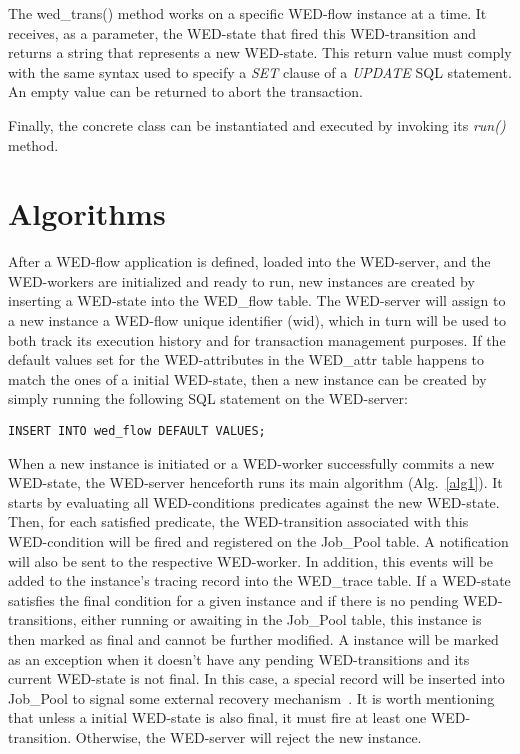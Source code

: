 \documentclass[12pt]{article}
\begin{document}
The wed\_trans() method works on a specific WED-flow instance at a time. It receives, as a parameter, the WED-state that  fired this WED-transition and returns a string that represents a new WED-state. This return value must comply with the same syntax used to specify a \emph{SET} clause of a \emph{UPDATE} SQL statement. An empty value can be returned to abort the transaction.

\par Finally, the concrete class can be instantiated and executed by invoking its \emph{run()} method.

\section{Algorithms}
\label{sec:alg}

After a WED-flow application is defined,  loaded into the WED-server, and the WED-workers are initialized and ready to run, new instances are created by inserting a WED-state into the WED\_flow table. The WED-server will assign to a new instance  a WED-flow unique identifier (wid), which in turn will be used to both track its execution history and for transaction management purposes. If the default values set for the WED-attributes in the WED\_attr table happens to match the ones of a initial WED-state, then a new instance can be created by simply running the following SQL statement on the WED-server:

\begin{Verbatim}[fontsize=\small]
     INSERT INTO wed_flow DEFAULT VALUES;
\end{Verbatim}

When a new instance is initiated or a WED-worker successfully commits a new WED-state, the WED-server henceforth runs its main algorithm (Alg.~\ref{alg1}). It starts by evaluating all WED-conditions predicates against the new WED-state. Then, for each satisfied predicate, the WED-transition associated with this WED-condition will be fired and registered on the Job\_Pool table. A notification will also be sent to the respective WED-worker. In addition, this events will be added to the instance's tracing record into the WED\_trace table. If a WED-state satisfies the final condition for a given instance and if there is no pending WED-transitions, either running or awaiting in the Job\_Pool table, this instance is then marked as final and cannot be further modified. A instance will be marked as an exception when it doesn't have any pending WED-transitions and its current WED-state is not final. In this case, a special record will be inserted into Job\_Pool to signal some external recovery
mechanism~\cite{ICWS12}. It is worth mentioning that unless a initial WED-state is also final, it must fire at least one WED-transition. Otherwise, the WED-server will reject the new instance. 
\end{document}
